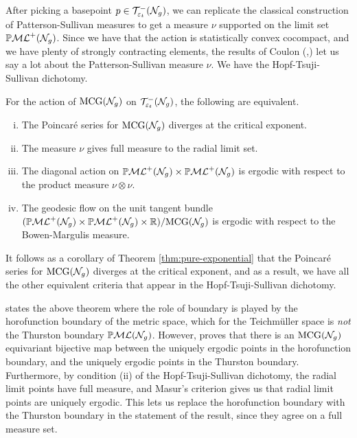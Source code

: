 After picking a basepoint $p \in \mathcal{T}_{\varepsilon_t}^{-}(\mathcal{N}_g)$, we can replicate the classical construction of Patterson-Sullivan measures \cite{sullivan1979density} to get a measure $\nu$ supported on the limit set $\mathbb{P}\mathcal{ML}^+(\mathcal{N}_g)$.
Since we have that the action is statistically convex cocompact, and we have plenty of strongly contracting elements, the results of Coulon (\cite{coulon2022patterson},\cite{coulon2024ergodicity}) let us say a lot about the Patterson-Sullivan measure $\nu$.
We have the Hopf-Tsuji-Sullivan dichotomy.

\begin{theorem}
  For the action of $\mathrm{MCG}(\mathcal{N}_g)$ on $\mathcal{T}_{\varepsilon_t}^{-}(\mathcal{N}_g)$, the following are equivalent.
  \begin{enumerate}[(i)]
  \item The Poincaré series for $\mathrm{MCG}(\mathcal{N}_g)$ diverges at the critical exponent.
  \item The measure $\nu$ gives full measure to the radial limit set.
  \item The diagonal action on $\mathbb{P}\mathcal{ML}^+(\mathcal{N}_g) \times \mathbb{P}\mathcal{ML}^+(\mathcal{N}_g)$ is ergodic with respect to the product measure $\nu \otimes \nu$.
  \item The geodesic flow on the unit tangent bundle $(\mathbb{P}\mathcal{ML}^+(\mathcal{N}_g) \times \mathbb{P}\mathcal{ML}^+(\mathcal{N}_g) \times \mathbb{R})/\mathrm{MCG}(\mathcal{N}_g)$ is ergodic with respect to the Bowen-Margulis measure.
  \end{enumerate}
\end{theorem}

It follows as a corollary of Theorem \ref{thm:pure-exponential} that the Poincaré series for $\mathrm{MCG}(\mathcal{N}_g)$ diverges at the critical exponent, and as a result, we have all the other equivalent criteria that appear in the Hopf-Tsuji-Sullivan dichotomy.

\begin{remark}
  \textcite{coulon2024ergodicity} states the above theorem where the role of boundary is played by the horofunction boundary of the metric space, which for the Teichmüller space is \emph{not} the Thurston boundary $\mathbb{P}\mathcal{ML}(\mathcal{N}_g)$.
  However, \textcite{miyachi2008teichmuller} proves that there is an $\mathrm{MCG}(\mathcal{N}_g)$ equivariant bijective map between the uniquely ergodic points in the horofunction boundary, and the uniquely ergodic points in the Thurston boundary.
  Furthermore, by condition (ii) of the Hopf-Tsuji-Sullivan dichotomy, the radial limit points have full measure, and Masur's criterion gives us that radial limit points are uniquely ergodic.
  This lets us replace the horofunction boundary with the Thurston boundary in the statement of the result, since they agree on a full measure set.
\end{remark}

